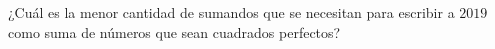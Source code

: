 ¿Cuál es la menor cantidad de sumandos que se necesitan para escribir a $2019$ como suma de números que sean cuadrados perfectos?